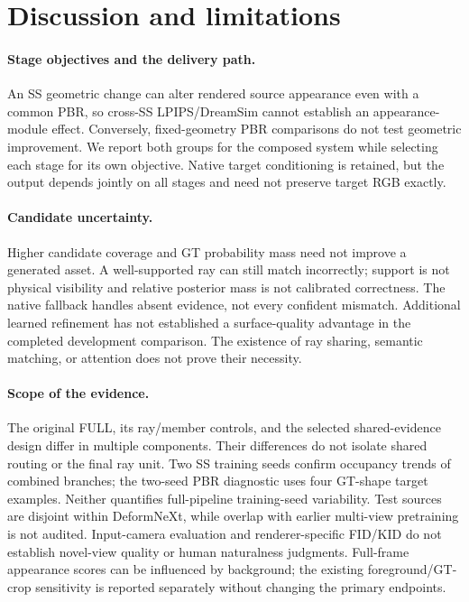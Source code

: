 \section{Discussion and limitations}
\ifFinalReportReady

\fi
\paragraph{Stage objectives and the delivery path.}
An SS geometric change can alter rendered source appearance even with a
common PBR, so cross-SS LPIPS/DreamSim cannot establish an appearance-module
effect. Conversely, fixed-geometry PBR comparisons do not test geometric
improvement. We report both groups for the composed system while selecting
each stage for its own objective. Native target conditioning is retained,
but the output depends jointly on all stages and need not preserve target
RGB exactly.

\paragraph{Candidate uncertainty.}
Higher candidate coverage and GT probability mass need not improve a
generated asset. A well-supported ray can still match incorrectly; support
is not physical visibility and relative posterior mass is not calibrated
correctness. The native fallback handles absent evidence, not every
confident mismatch. Additional learned refinement has not established a
surface-quality advantage in the completed development comparison. The
existence of ray sharing, semantic matching, or attention does not prove
their necessity.

\paragraph{Scope of the evidence.}
The original FULL, its ray/member controls, and the selected shared-evidence
design differ in multiple components. Their differences do not isolate
shared routing or the final ray unit. Two SS training seeds confirm
occupancy trends of combined branches; the two-seed PBR diagnostic uses
four GT-shape target examples. Neither quantifies full-pipeline training-seed
variability. Test sources are disjoint within DeformNeXt, while overlap with
earlier multi-view pretraining is not audited. Input-camera evaluation and
renderer-specific FID/KID do not establish novel-view quality or human
naturalness judgments. Full-frame appearance scores can be influenced by
background; the existing foreground/GT-crop sensitivity is reported
separately without changing the primary endpoints.
